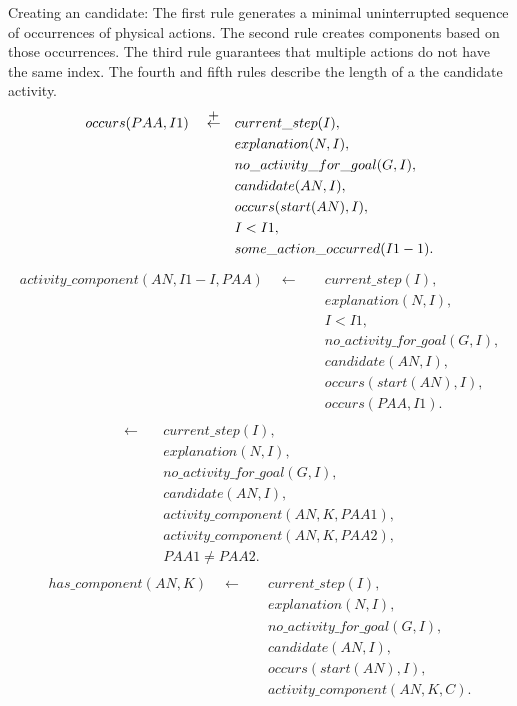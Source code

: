 \documentclass[11pt, oneside]{article}
\begin{document}
Creating an candidate: The first rule generates a minimal uninterrupted sequence of occurrences of physical actions. The second rule creates components based on those occurrences. The third rule guarantees that multiple actions do not have the same index. The fourth and fifth rules describe the length of a the candidate activity.
\begin{align}\begin{split}
occurs(PAA,I1) \quad \stackrel{\mathclap{\normalfont\mbox{+}}}{\leftarrow}  \quad &current\_step(I),\\
&explanation(N,I),\\
&no\_activity\_for\_goal(G,I),\\
&candidate(AN,I),\\
&occurs(start(AN),I),\\
&I<I1,\\
&some\_action\_occurred(I1-1).
\end{split}\end{align}
\begin{align}\begin{split}
activity\_component(AN,I1-I, PAA) \quad \leftarrow \quad &current\_step(I),\\
&explanation(N,I),\\
&I<I1,\\
&no\_activity\_for\_goal(G,I),\\
&candidate(AN,I),\\
&occurs(start(AN),I),\\
&occurs(PAA,I1).
\end{split}\end{align}
\begin{align}\begin{split}
 \leftarrow \quad &current\_step(I),\\
&explanation(N,I),\\
&no\_activity\_for\_goal(G,I),\\
&candidate(AN,I),\\
&activity\_component(AN,K,PAA1),\\
&activity\_component(AN,K,PAA2),\\
&PAA1\neq PAA2.
\end{split}\end{align}
\begin{align}\begin{split}
has\_component(AN,K)\quad \leftarrow \quad &current\_step(I),\\
&explanation(N,I),\\
&no\_activity\_for\_goal(G,I),\\
&candidate(AN,I),\\
&occurs(start(AN),I),\\
&activity\_component(AN,K,C).
\end{split}\end{align}
\end{document}
